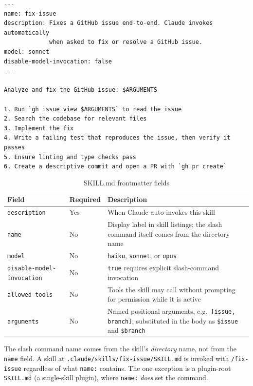 \begin{lstlisting}[caption={Example \texttt{SKILL.md} with frontmatter}]
---
name: fix-issue
description: Fixes a GitHub issue end-to-end. Claude invokes automatically
             when asked to fix or resolve a GitHub issue.
model: sonnet
disable-model-invocation: false
---

Analyze and fix the GitHub issue: $ARGUMENTS

1. Run `gh issue view $ARGUMENTS` to read the issue
2. Search the codebase for relevant files
3. Implement the fix
4. Write a failing test that reproduces the issue, then verify it passes
5. Ensure linting and type checks pass
6. Create a descriptive commit and open a PR with `gh pr create`
\end{lstlisting}

\begin{table}[ht]
\centering
\caption{SKILL.md frontmatter fields}
\label{tab:skill-frontmatter}
\begin{tabularx}{\textwidth}{llX}
\toprule
\textbf{Field} & \textbf{Required} & \textbf{Description} \\
\midrule
\texttt{description}              & Yes & When Claude auto-invokes this skill \\
\texttt{name}                     & No  & Display label in skill listings; the slash command itself comes from the directory name \\
\texttt{model}                    & No  & \texttt{haiku}, \texttt{sonnet}, or \texttt{opus} \\
\texttt{disable-model-invocation} & No  & \texttt{true} requires explicit slash-command invocation \\
\texttt{allowed-tools}            & No  & Tools the skill may call without prompting for permission while it is active \\
\texttt{arguments}                & No  & Named positional arguments, e.g.\ \texttt{[issue, branch]}; substituted in the body as \texttt{\$issue} and \texttt{\$branch} \\
\bottomrule
\end{tabularx}
\end{table}

\begin{notebox}
The slash command name comes from the skill's \emph{directory} name, not
from the \texttt{name} field. A skill at
\texttt{.claude/skills/fix-issue/SKILL.md} is invoked with
\texttt{/fix-issue} regardless of what \texttt{name:} contains. The one
exception is a plugin-root \texttt{SKILL.md} (a single-skill plugin),
where \texttt{name:} \emph{does} set the command.
\end{notebox}

